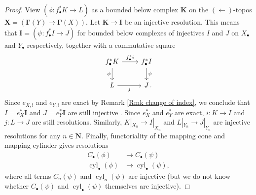 \documentclass[11pt]{amsart}
\theoremstyle{definition}
\newcommand{\cyl}{\operatorname{cyl}}
\newcommand{\punct}[1]{\makebox[0pt][l]{\,#1}} %
\begin{document}
\begin{proof}
View $(\phi \colon f_\bullet^* K \to L)$ as a bounded below complex
$\mathbf K$ on the $(\leftarrow)$-topos $\mathbf X = (\mathbf
\Gamma(Y) \to \mathbf \Gamma(X))$. Let $\mathbf K \to \mathbf I$ be
an injective resolution. This means that $\mathbf I = (\psi \colon
f_\bullet^* I \to J)$ for bounded below complexes of injectives $I$
and $J$ on $X_\bullet$ and $Y_\bullet$ respectively, together with a
commutative square
\begin{equation*}
\begin{tikzcd}
f_\bullet^*K \ar{r}{f_\bullet^*i}\ar{d}[swap]{\phi} & f_\bullet^*I \ar{d}{\psi}\\
L \ar{r}[swap]{j} & J\punct{.}
\end{tikzcd}
\end{equation*}
Since $e_{X,!}$ and $e_{Y,!}$ are exact by Remark \ref{Rmk change of
index}, we conclude that $I = e_X^* \mathbf I$ and $J = e_Y^*
\mathbf I$ are still injective
\cite[Tag~\href{https://stacks.math.columbia.edu/tag/015Z}{015Z}]{Stacks}.
Since $e_X^*$ and $e_Y^*$ are exact, $i \colon K \to I$ and $j
\colon L \to J$ are still resolutions. Similarly, $K|_{X_n} \to
I|_{X_n}$ and $L|_{Y_n} \to J|_{Y_n}$ are injective resolutions for
any $n \in \mathbf N$.  Finally, functoriality of the mapping cone
and mapping cylinder gives resolutions
\begin{align*}
C_\bullet(\phi) &\to C_\bullet(\psi) \\
\cyl_\bullet(\phi) &\to \cyl_\bullet(\psi),
\end{align*}
where all terms $C_n(\psi)$ and $\cyl_n(\psi)$ are injective (but we
do not know whether $C_\bullet(\psi)$ and $\cyl_\bullet(\psi)$
themselves are injective).


\end{proof}
\end{document}
